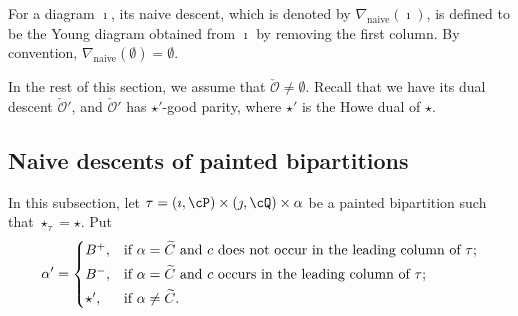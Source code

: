 \documentclass[12pt,a4paper]{amsart}
\newcommand{\CO}{{\mathcal {O}}}
\def\eDD{\overline{\nabla}}
\numberwithin{equation}{section}
\theoremstyle{remark}
\begin{document}
For a diagram $\imath$, its naive descent, which is denoted by $\nabla_\mathrm{naive}(\imath)$, is defined to be the Young diagram obtained from $\imath$ by removing the first column. By convention, $\nabla_\mathrm{naive}(\emptyset)=\emptyset$.

In the rest of this section, we assume that $\check \CO\neq \emptyset$. Recall that we have its dual descent $\check \CO'$, and $\check \CO'$ has $\star'$-good parity, where $\star'$ is the Howe dual of $\star$.

 \subsection{Naive descents of painted bipartitions }
\def\bipartl{\mathrm{bi\cP_L}}
\def\bipartr{\mathrm{bi\cP_R}}
\def\dsdiagl{\mathrm{DS_L}}
\def\dsdiagr{\mathrm{DS_R}}
\def\DDl{\eDD_\mathrm{L}}
\def\DDr{\eDD_\mathrm{R}}


In this subsection, let $\tau=(\imath,\cP)\times (\jmath,\cQ)\times \alpha$ be a  painted bipartition such that $\star_\tau=\star$. Put
  \begin{equation} \label{eq:def.alphap}
    \alpha'=\begin{cases} B^+,
  & \textrm{if $\alpha=\widetilde{C}$ and $c$ does not occur in the leading column of $\tau$}; \smallskip \\
  B^-,
  & \textrm{if $\alpha=\widetilde{C}$ and  $c$ occurs in the leading column of $\tau$}; \smallskip \\
  \star', & \textrm{if $\alpha\neq \widetilde C$}.
  \end{cases}
  \end{equation}
\end{document}
